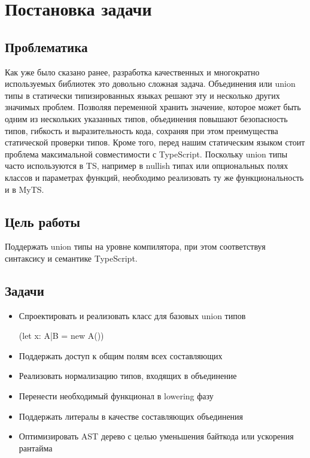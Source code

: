 \section{Постановка задачи}
\label{sec:Chapter1} 

\subsection{Проблематика}

Как уже было сказано ранее, разработка качественных и многократно используемых библиотек это довольно сложная задача.
Объединения или union типы в статически типизированных языках решают эту и несколько других значимых проблем.
Позволяя переменной хранить значение, которое может быть одним из нескольких указанных типов, объединения повышают
безопасность типов, гибкость и выразительность кода, сохраняя при этом преимущества статической проверки типов.
Кроме того, перед нашим статическим языком стоит проблема максимальной совместимости с TypeScript.
Поскольку union типы часто используются в TS, например в nullish типах или опциональных полях классов и параметрах
функций, необходимо реализовать ту же функциональность и в MyTS.

\subsection{Цель работы}

Поддержать union типы на уровне компилятора, при этом соответствуя синтаксису и семантике TypeScript.

\subsection{Задачи}

\begin{itemize}[left=2em]
    \item Спроектировать и реализовать класс для базовых union типов

    (let x: A|B = new A())
    \item Поддержать доступ к общим полям всех составляющих
    \item Реализовать нормализацию типов, входящих в объединение
    \item Перенести необходимый функционал в lowering фазу
    \item Поддержать литералы в качестве составляющих объединения
    \item Оптимизировать AST дерево с целью уменьшения байткода или ускорения рантайма
\end{itemize}

